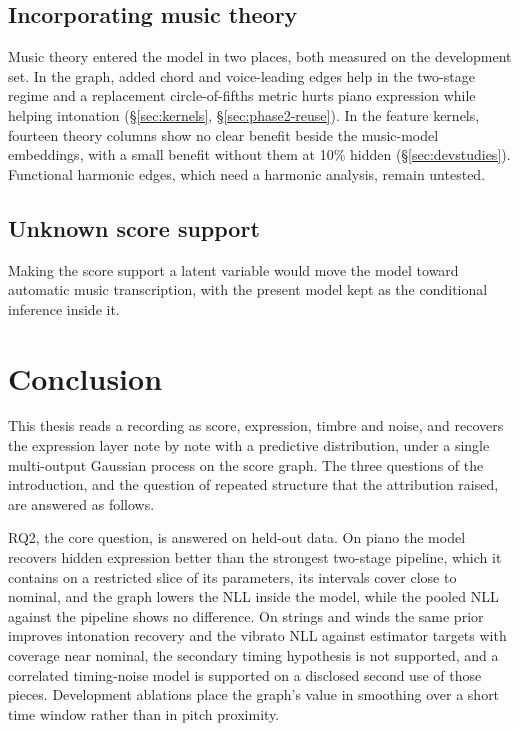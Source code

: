 \documentclass[11pt,a4paper]{report}
\begin{document}
\section{Incorporating music theory}\label{sec:musictheory}
Music theory entered the model in two places, both measured on the
development set. In the graph, added chord and voice-leading edges help in
the two-stage regime and a replacement circle-of-fifths metric hurts piano
expression while helping intonation (\S\ref{sec:kernels},
\S\ref{sec:phase2-reuse}). In the feature kernels, fourteen theory columns
show no clear benefit beside the music-model embeddings, with a small
benefit without them at 10\% hidden (\S\ref{sec:devstudies}).
Functional harmonic edges, which need a harmonic analysis, remain untested.

\section{Unknown score support}\label{sec:future-amt}
Making the score support a latent variable would move the model toward
automatic music transcription, with the present model kept as the
conditional inference inside it.


\chapter{Conclusion}\label{ch:conclusion}
This thesis reads a recording as score, expression, timbre and noise, and
recovers the expression layer note by note with a predictive distribution,
under a single multi-output Gaussian process on the score graph. The three
questions of the introduction, and the question of repeated structure that
the attribution raised, are answered as follows.

RQ2, the core question, is answered on held-out data. On piano the model
recovers hidden expression better than the strongest two-stage pipeline,
which it contains on a restricted slice of its parameters, its intervals
cover close to nominal, and the graph lowers the NLL inside the model,
while the pooled NLL against the pipeline shows no difference. On strings
and winds the same prior improves intonation recovery and the vibrato NLL
against estimator targets with coverage near nominal, the secondary timing
hypothesis is not supported, and a correlated timing-noise model is
supported on a disclosed second use of those pieces. Development ablations
place the graph's value in smoothing over a short time window rather than
in pitch proximity.
\end{document}
